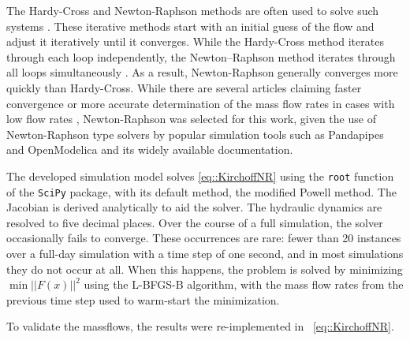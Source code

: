 The Hardy-Cross \cite{HardyCross} and Newton-Raphson \cite{NewtonenHard} methods are often used to solve such systems \cite{KUNTUAROVA}. These iterative methods start with an initial guess of the flow and adjust it iteratively until it converges. While the Hardy-Cross method iterates through each loop independently, the Newton–Raphson method iterates through all loops simultaneously \cite{NewtonenHard}. As a result, Newton-Raphson generally converges more quickly than Hardy-Cross. While there are several articles claiming faster convergence or more accurate determination of the mass flow rates in cases with low flow rates \cite{STEVANOVIC, ARSENE}, Newton-Raphson was selected for this work, given the use of Newton-Raphson type solvers by popular simulation tools such as Pandapipes \cite{pandapipes} and OpenModelica \cite{OpenModelica} and its widely available documentation. 



The developed simulation model solves \eqref{eq::KirchoffNR} using the \texttt{root} function of the \texttt{SciPy} \cite{scipy} package, with its default method, the modified Powell method. The Jacobian is derived analytically to aid the solver. The hydraulic dynamics are resolved to five decimal places. Over the course of a full simulation, the solver occasionally fails to converge. These occurrences are rare: fewer than 20 instances over a full-day simulation with a time step of one second, and in most simulations they do not occur at all. When this happens, the problem is solved by minimizing $\min ||F(x)||^{2}$ using the L-BFGS-B algorithm, with the mass flow rates from the previous time step used to warm-start the minimization.

To validate the massflows, the results were re-implemented in ~\eqref{eq::KirchoffNR}. 

